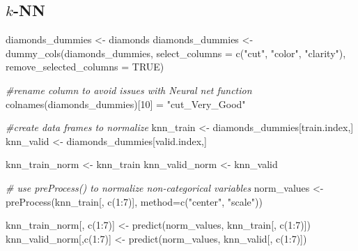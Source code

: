 \documentclass[
]{article}
\newenvironment{Shaded}{\begin{snugshade}}{\end{snugshade}}
\newcommand{\AttributeTok}[1]{\textcolor[rgb]{0.77,0.63,0.00}{#1}}
\newcommand{\CommentTok}[1]{\textcolor[rgb]{0.56,0.35,0.01}{\textit{#1}}}
\newcommand{\ConstantTok}[1]{\textcolor[rgb]{0.00,0.00,0.00}{#1}}
\newcommand{\DecValTok}[1]{\textcolor[rgb]{0.00,0.00,0.81}{#1}}
\newcommand{\FunctionTok}[1]{\textcolor[rgb]{0.00,0.00,0.00}{#1}}
\newcommand{\NormalTok}[1]{#1}
\newcommand{\OtherTok}[1]{\textcolor[rgb]{0.56,0.35,0.01}{#1}}
\newcommand{\SpecialCharTok}[1]{\textcolor[rgb]{0.00,0.00,0.00}{#1}}
\newcommand{\StringTok}[1]{\textcolor[rgb]{0.31,0.60,0.02}{#1}}
\begin{document}
\hypertarget{k-nn}{%
\subsection{\texorpdfstring{\(k\)-NN}{k-NN}}\label{k-nn}}

\begin{Shaded}
\begin{Highlighting}[]
\NormalTok{diamonds\_dummies }\OtherTok{\textless{}{-}}\NormalTok{ diamonds}
\NormalTok{diamonds\_dummies }\OtherTok{\textless{}{-}} \FunctionTok{dummy\_cols}\NormalTok{(diamonds\_dummies, }
                               \AttributeTok{select\_columns =} \FunctionTok{c}\NormalTok{(}\StringTok{"cut"}\NormalTok{, }\StringTok{"color"}\NormalTok{, }\StringTok{"clarity"}\NormalTok{), }
                               \AttributeTok{remove\_selected\_columns =} \ConstantTok{TRUE}\NormalTok{)}

\CommentTok{\#rename column to avoid issues with Neural net function}
\FunctionTok{colnames}\NormalTok{(diamonds\_dummies)[}\DecValTok{10}\NormalTok{] }\OtherTok{=} \StringTok{"cut\_Very\_Good"}
\end{Highlighting}
\end{Shaded}

\begin{Shaded}
\begin{Highlighting}[]
\CommentTok{\#create data frames to normalize}
\NormalTok{knn\_train }\OtherTok{\textless{}{-}}\NormalTok{ diamonds\_dummies[train.index,]}
\NormalTok{knn\_valid }\OtherTok{\textless{}{-}}\NormalTok{ diamonds\_dummies[valid.index,]}

\NormalTok{knn\_train\_norm }\OtherTok{\textless{}{-}}\NormalTok{ knn\_train}
\NormalTok{knn\_valid\_norm }\OtherTok{\textless{}{-}}\NormalTok{ knn\_valid}

\CommentTok{\# use preProcess() to normalize non{-}categorical variables}
\NormalTok{norm\_values }\OtherTok{\textless{}{-}} \FunctionTok{preProcess}\NormalTok{(knn\_train[, }\FunctionTok{c}\NormalTok{(}\DecValTok{1}\SpecialCharTok{:}\DecValTok{7}\NormalTok{)], }\AttributeTok{method=}\FunctionTok{c}\NormalTok{(}\StringTok{"center"}\NormalTok{, }\StringTok{"scale"}\NormalTok{))}

\NormalTok{knn\_train\_norm[, }\FunctionTok{c}\NormalTok{(}\DecValTok{1}\SpecialCharTok{:}\DecValTok{7}\NormalTok{)] }\OtherTok{\textless{}{-}} \FunctionTok{predict}\NormalTok{(norm\_values, knn\_train[, }\FunctionTok{c}\NormalTok{(}\DecValTok{1}\SpecialCharTok{:}\DecValTok{7}\NormalTok{)])}
\NormalTok{knn\_valid\_norm[,}\FunctionTok{c}\NormalTok{(}\DecValTok{1}\SpecialCharTok{:}\DecValTok{7}\NormalTok{)] }\OtherTok{\textless{}{-}} \FunctionTok{predict}\NormalTok{(norm\_values, knn\_valid[, }\FunctionTok{c}\NormalTok{(}\DecValTok{1}\SpecialCharTok{:}\DecValTok{7}\NormalTok{)])}
\end{Highlighting}
\end{Shaded}
\end{document}
